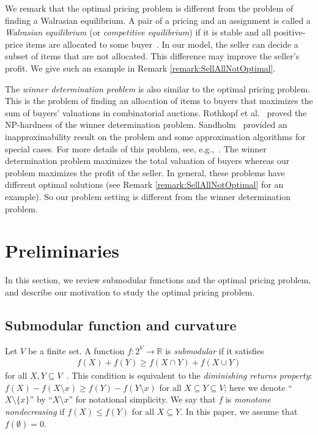 \documentclass[letterpaper]{article}
\theoremstyle{definition}
\begin{document}
We remark that the optimal pricing problem is different from the problem of finding a Walrasian equilibrium.
A pair of a pricing and an assignment is called a \emph{Walrasian equilibrium} (or \emph{competitive equilibrium}) if it is stable and all positive-price items are allocated to some buyer~\cite{nisan2007algorithmic11}.
In our model, the seller can decide a subset of items that are not allocated.
This difference may improve the seller's profit.
We give such an example in Remark \ref{remark:SellAllNotOptimal}.

The \emph{winner determination problem} is also similar to the optimal pricing problem.
This is the problem of finding an allocation of items to buyers that maximizes the sum of buyers' valuations in combinatorial auctions.
Rothkopf et al.~ proved the NP-hardness of the winner determination problem. %
Sandholm~ provided an inapproximability result on the problem and some approximation algorithms for special cases.
For more details of this problem, see, e.g.,~\cite{nisan2007algorithmic11,cramton2006combinatorial}.
The winner determination problem maximizes the total valuation of buyers whereas our problem maximizes the profit of the seller.
In general, these problems have different optimal solutions (see Remark \ref{remark:SellAllNotOptimal} for an example).
So our problem setting is different from the winner determination problem.



\section{Preliminaries}
\label{sec:preliminaries}

In this section, we review submodular functions and the optimal pricing problem, and describe our motivation to study the optimal pricing problem.



\subsection{Submodular function and curvature}

Let $V$ be a finite set.
A function $f: 2^V \to \mathbb{R}$ is \emph{submodular} if it satisfies
\begin{align}
\label{eq:submodular}
f(X) + f(Y) \ge f(X \cap Y) + f(X \cup Y)
\end{align}
for all $X, Y \subseteq V$~\cite{fujishige2005submodular}.
This condition is equivalent to the \emph{diminishing returns property}:
$f(X) - f(X \setminus x) \ge f(Y) - f(Y \setminus x)$
for all $X \subseteq Y \subseteq V$;
here we denote ``$X \setminus \{x\}$'' by ``$X \setminus x$'' for notational simplicity.
We say that $f$ is \emph{monotone nondecreasing} if $f(X) \le f(Y)$ for all $X \subseteq Y$.
In this paper, we assume that $f(\emptyset) = 0$.
\end{document}
